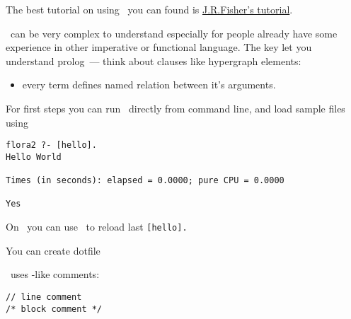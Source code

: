 \secdown

The best tutorial on using \prolog\ you can found is
\href{https://www.cpp.edu/~jrfisher/www/prolog_tutorial/contents.html}{J.R.Fisher's
tutorial}.

\bigskip
\prolog\ can be very complex to understand especially for people already have
some experience in other imperative or functional language. The key let you
understand prolog\ --- think about clauses like hypergraph elements:
\begin{itemize}
  \item 
every term defines named relation between it's arguments.
\end{itemize}

\clearpage
For first steps you can run \flora\ directly from command line, and load sample
files using



\begin{verbatim}
flora2 ?- [hello].
Hello World

Times (in seconds): elapsed = 0.0000; pure CPU = 0.0000

Yes
\end{verbatim}

On \win\ you can use \keys{\arrowkeyup}\ to reload last \verb$[hello].$


You can create dotfile


\flora\ uses \cpp-like comments:
\begin{verbatim}
// line comment
/* block comment */
\end{verbatim}

\clearpage
{}


\secup
